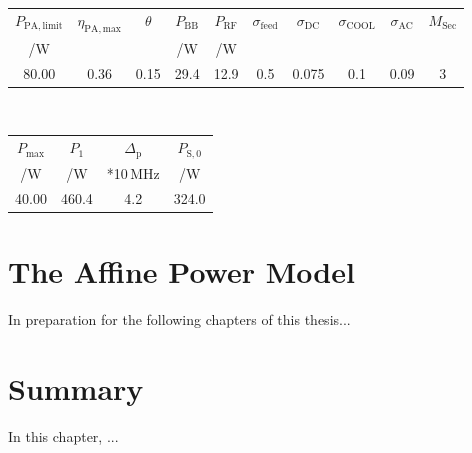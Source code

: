 \begin{table*}[t]
\centering
\begin{tabular}{|c|c|c|c|c|c|c|c|c|c|}
\hline
 $P_{\mathrm{PA,limit}}$	& $\eta_\mathrm{PA,max}$	& $\theta$	& $P_\mathrm{BB}$	& $P_\mathrm{RF}$	& $\sigma_\mathrm{feed}$	& $\sigma_\mathrm{DC}$	& $\sigma_\mathrm{COOL}$	& $\sigma_\mathrm{AC}$ 	& $M_{\mathrm{Sec}}$ 	\\
 /W			&				&		&	/W		&	/W		&				&			&	&&\\
\hline
 	80.00		& 	0.36			& 	0.15	& 	29.4		& 	12.9		& 	0.5			& 	0.075		& 	0.1
& 	0.09	& 	3			\\
\hline
\end{tabular}
\\
\begin{tabular}{|c|c|c|c|}
\hline
 $P_{\mathrm{max}}$  	& $P_{1}$  		& $\Delta_{\mathrm{p}}$ & $P_{\mathrm{S},0}$\\
		/W		&	/W		& *10\,MHz		& /W\\
\hline
	40.00		& 	460.4 		& 	4.2 		&	324.0 \\
\hline
\end{tabular}

\caption[Parameter breakdown]{Parameter breakdown.}
\label{tab:powerbreakdownmaximumload}
\end{table*}

\section{The Affine Power Model}
\label{affinemodel}
In preparation for the following chapters of this thesis...

\section{Summary}
\label{ch3:summary}
In this chapter, ...

